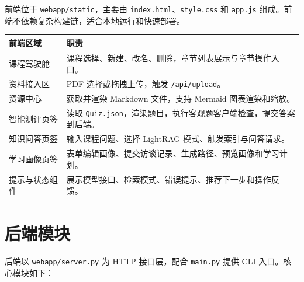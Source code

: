 \documentclass[UTF8,fontset=windows,zihao=-4,openany]{ctexrep}
\begin{document}
前端位于 \texttt{webapp/static}，主要由 \texttt{index.html}、\texttt{style.css} 和 \texttt{app.js} 组成。前端不依赖复杂构建链，适合本地运行和快速部署。

\begin{longtable}{p{}p{}}
\toprule
前端区域 & 职责\\
\midrule
课程驾驶舱 & 课程选择、新建、改名、删除，章节列表展示与章节操作入口。\\
资料接入区 & PDF 选择或拖拽上传，触发 \texttt{/api/upload}。\\
资源中心 & 获取并渲染 Markdown 文件，支持 Mermaid 图表渲染和缩放。\\
智能测评页签 & 读取 \texttt{Quiz.json}，渲染题目，执行客观题客户端检查，提交答案到后端。\\
知识问答页签 & 输入课程问题、选择 LightRAG 模式、触发索引与问答请求。\\
学习画像页签 & 表单编辑画像、提交访谈记录、生成路径、预览画像和学习计划。\\
提示与状态组件 & 展示模型接口、检索模式、错误提示、推荐下一步和操作反馈。\\
\bottomrule
\end{longtable}

\section{后端模块}

后端以 \texttt{webapp/server.py} 为 HTTP 接口层，配合 \texttt{main.py} 提供 CLI 入口。核心模块如下：
\end{document}

